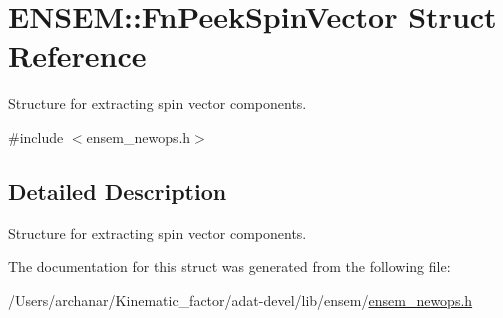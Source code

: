 \hypertarget{structENSEM_1_1FnPeekSpinVector}{}\section{E\+N\+S\+EM\+:\+:Fn\+Peek\+Spin\+Vector Struct Reference}
\label{structENSEM_1_1FnPeekSpinVector}


Structure for extracting spin vector components.  




{\ttfamily \#include $<$ensem\+\_\+newops.\+h$>$}



\subsection{Detailed Description}
Structure for extracting spin vector components. 

The documentation for this struct was generated from the following file\+:\begin{DoxyCompactItemize}
\item 
/\+Users/archanar/\+Kinematic\+\_\+factor/adat-\/devel/lib/ensem/\mbox{\hyperlink{adat-devel_2lib_2ensem_2ensem__newops_8h}{ensem\+\_\+newops.\+h}}\end{DoxyCompactItemize}
